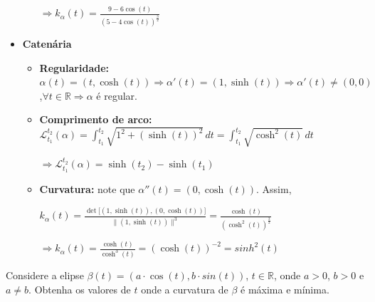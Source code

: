 \documentclass[../main.tex]{subfiles}
\begin{document}
\begin{solucao}
\begin{itemize}
\begin{itemize}
			$\Rightarrow k_\alpha(t)=\frac{9-6\cos(t)}{(5-4\cos(t))^{\frac{3}{2}}}$
		\end{itemize}
		\item \textbf{Catenária}
		\begin{itemize}
			\item \textbf{Regularidade:} $\alpha(t)=(t,\cosh(t))\Rightarrow \alpha'(t)=(1,\sinh(t))\Rightarrow \alpha'(t)\neq(0,0)$,$\forall t\in \mathbb{R}\Rightarrow \alpha$ é regular.
			\item \textbf{Comprimento de arco:}  $\mathcal{L}_{t_1}^{t_2}(\alpha)=\int_{t_1}^{t_2} \sqrt{1^2+(\sinh(t))^2}\, dt=\int_{t_1}^{t_2} \sqrt{\cosh^2(t)}\, dt$
			
			$\Rightarrow \mathcal{L}_{t_1}^{t_2}(\alpha)=\sinh(t_2)-\sinh(t_1)$
			\item \textbf{Curvatura:} note que $\alpha''(t)=(0,\cosh(t))$. Assim,
			
			$k_\alpha(t)=\frac{\det\big[(1,\sinh(t)), (0,\cosh(t))\big]}{\|(1,\sinh(t))\|^3}=\frac{\cosh(t)}{(\cosh^2(t))^{\frac{3}{2}}}$
			
			$\Rightarrow k_\alpha(t)=\frac{\cosh(t)}{\cosh^3(t)}=(\cosh(t))^{-2}=sinh^2(t)$
		\end{itemize}
	\end{itemize}
\end{solucao}

\begin{exercicio}{8}
	Considere a elipse $\beta(t)=(a\cdot \cos(t), b\cdot sin(t))$, $t\in \mathbb{R}$, onde $a > 0$, $b > 0$ e $a\neq b$. Obtenha os valores de $t$ onde a curvatura de $\beta$ é máxima e mínima.
\end{exercicio}
\end{document}
